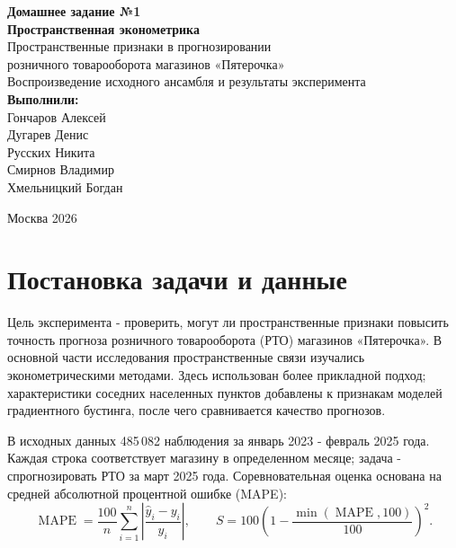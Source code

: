 \documentclass[12pt, a4paper]{article}
\begin{document}
\begin{titlepage}
    \thispagestyle{empty}
    \begin{center}
        \linespread{1.1}\selectfont
        \textbf{Домашнее задание №1}\\[1cm]
        \Large{\textbf{Пространственная эконометрика}}\\[1cm]
        \large{Пространственные признаки в прогнозировании\\
        розничного товарооборота магазинов «Пятерочка»}\\[0.6cm]
        \normalsize{Воспроизведение исходного ансамбля и результаты эксперимента}\\[1.5cm]
        \normalsize
        \textbf{Выполнили:}\\[0.4cm]
        Гончаров Алексей\\
        Дугарев Денис\\
        Русских Никита\\
        Смирнов Владимир\\
        Хмельницкий Богдан\\[2cm]
    \end{center}
    \vfill
    \begin{center}
        Москва 2026
    \end{center}
\end{titlepage}

\setcounter{page}{2}

\section*{Постановка задачи и данные}

Цель эксперимента - проверить, могут ли пространственные признаки повысить точность прогноза розничного товарооборота (РТО) магазинов «Пятерочка».
В основной части исследования пространственные связи изучались эконометрическими методами.
Здесь использован более прикладной подход; характеристики соседних населенных пунктов добавлены к признакам моделей градиентного бустинга,
после чего сравнивается качество прогнозов.

В исходных данных 485\,082 наблюдения за январь 2023 - февраль 2025 года.
Каждая строка соответствует магазину в определенном месяце; задача - спрогнозировать РТО за март 2025 года.
Соревновательная оценка основана на средней абсолютной процентной ошибке (MAPE):
\begin{equation}
\operatorname{MAPE}=\frac{100}{n}\sum_{i=1}^n\left|\frac{\widehat y_i-y_i}{y_i}\right|,
\qquad
S=100\left(1-\frac{\min(\operatorname{MAPE},100)}{100}\right)^2.
\label{eq:score}
\end{equation}
\end{document}
